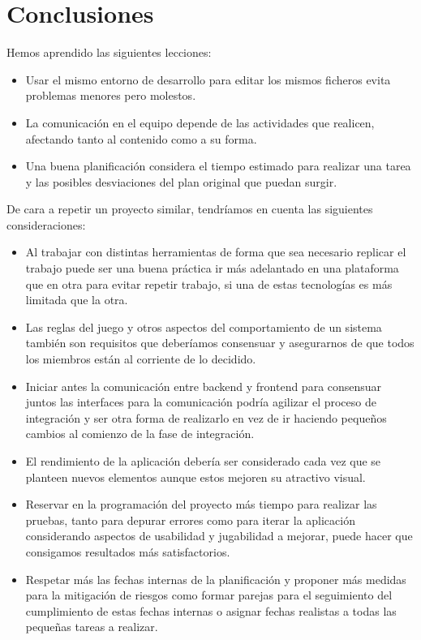 \documentclass[11pt]{article}
\begin{document}
\section{Conclusiones}
\label{sec:con}
Hemos aprendido las siguientes lecciones:
\begin{itemize}
	\item Usar el mismo entorno de desarrollo para editar los mismos
			ficheros evita problemas menores pero molestos.
	\item La comunicación en el equipo depende de las actividades que
			realicen, afectando tanto al contenido como a su forma.
	\item Una buena planificación considera el tiempo estimado para
			realizar una tarea y las posibles desviaciones del plan
			original que puedan surgir.
\end{itemize}

De cara a repetir un proyecto similar, tendríamos en cuenta las siguientes consideraciones:
\begin{itemize}
	\item Al trabajar con distintas herramientas de forma que sea
			necesario replicar el trabajo puede ser una buena práctica
			ir más adelantado en una plataforma que en otra para evitar
			repetir trabajo, si una de estas tecnologías es más
			limitada que la otra.
	\item Las reglas del juego y otros aspectos del comportamiento de un sistema 
			también son requisitos que deberíamos consensuar y asegurarnos de que
			todos los miembros están al corriente de lo decidido.
	\item Iniciar antes la comunicación entre backend y frontend para consensuar
			juntos las interfaces para la comunicación podría agilizar el proceso
			de integración y ser otra forma de realizarlo en vez de ir haciendo
			pequeños cambios al comienzo de la fase de integración.
	\item El rendimiento de la aplicación debería ser considerado cada vez que se
			planteen nuevos elementos aunque estos mejoren su atractivo visual.
	\item Reservar en la programación del proyecto más tiempo para realizar las
			pruebas, tanto para depurar errores como para iterar la aplicación
			considerando aspectos de usabilidad y jugabilidad a mejorar, puede
			hacer que consigamos resultados más satisfactorios.
	\item Respetar más las fechas internas de la planificación y proponer más medidas
			para la mitigación de riesgos como formar parejas para el seguimiento del
			cumplimiento de estas fechas internas o asignar fechas realistas
			a todas las pequeñas tareas a realizar. 
\end{itemize}
\end{document}
